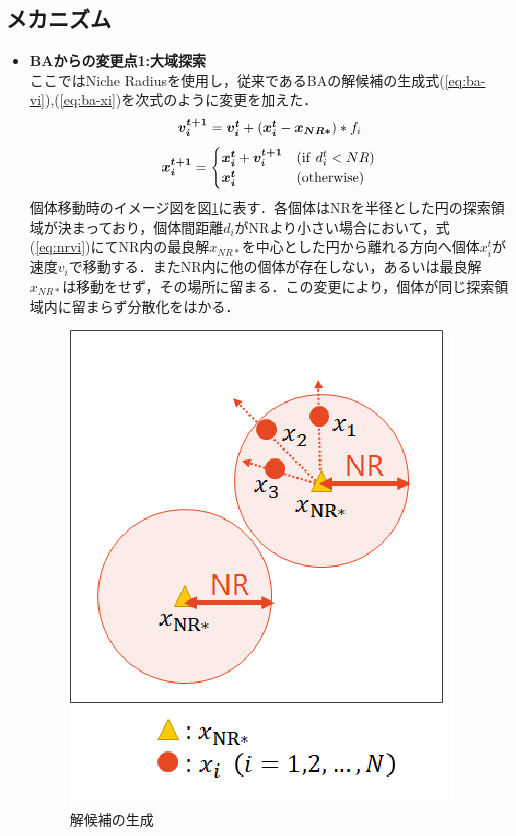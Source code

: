\documentclass[a4j,11pt]{jarticle}
\begin{document}
\subsection{メカニズム}
\label{ss:NRBA-abst}
\begin{itemize}
\item {\bf BAからの変更点1:大域探索} \\
ここではNiche Radiusを使用し，従来であるBAの解候補の生成式(\ref{eq:ba-vi}),(\ref{eq:ba-xi})を次式のように変更を加えた．
\begin{equation}
\label{eq:nrvi}
\mbox{\boldmath $v_i^{t+1}$}=\mbox{\boldmath $v_i^t$}+(\mbox{\boldmath $x_i^t$}-\mbox{\boldmath $x_{NR*}$})*f_i
\end{equation}
\begin{equation}
\label{eq:nrxi}
\mbox{\boldmath $x_i^{t+1}$}= \begin{cases}
\mbox{\boldmath $x_i^t$}+\mbox{\boldmath $v_i^{t+1}$} & ({\rm if} \ d_i^t < NR) \\
\mbox{\boldmath $x_i^t$} & ({\rm otherwise})
\end{cases}
\end{equation}
個体移動時のイメージ図を図\ref{fig:nr}に表す．各個体はNRを半径とした円の探索領域が決まっており，個体間距離${d_i}$がNRより小さい場合において，式(\ref{eq:nrvi})にてNR内の最良解${x_{NR*}}$を中心とした円から離れる方向へ個体${x_i^t}$が速度${v_i}$で移動する．またNR内に他の個体が存在しない，あるいは最良解$x_{NR*}$は移動をせず，その場所に留まる．この変更により，個体が同じ探索領域内に留まらず分散化をはかる．
\begin{figure}[h]
  \centering
  \includegraphics[width=0.5\linewidth]{eps/SICESSI2018/niche_radius.eps}
  \caption{解候補の生成}
  \label{fig:nr}
\end{figure}


\end{itemize}
\end{document}
